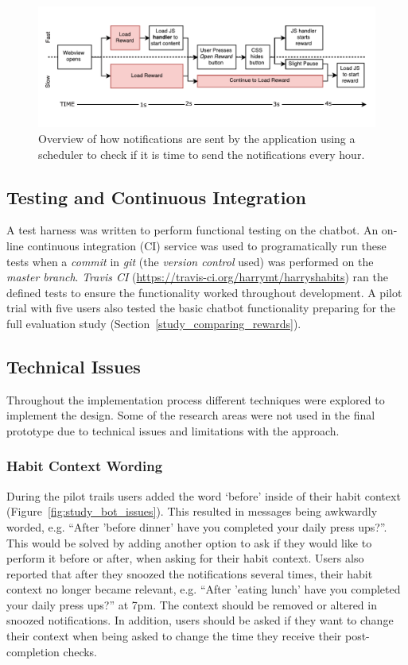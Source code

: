 \begin{figure}[H]
    \centering
    \includegraphics[width=6in]{../resources/diagrams/webview-flow-diagram.pdf}
    \caption{Overview of how notifications are sent by the application using a scheduler to check if it is time to send the notifications every hour.}
    \label{fig:fast_slow_opening_rewards}
\end{figure}


\subsection{Testing and Continuous Integration}
A test harness was written to perform functional testing on the chatbot. An on-line continuous integration (CI) service was used to programatically run these tests when a \textit{commit} in \textit{git} (the \textit{version control} used) was performed on the \textit{master branch}. \textit{Travis CI} (\url{https://travis-ci.org/harrymt/harryshabits}) ran the defined tests to ensure the functionality worked throughout development. A pilot trial with five users also tested the basic chatbot functionality preparing for the full evaluation study (Section~\ref{study_comparing_rewards}).


\subsection{Technical Issues}
Throughout the implementation process different techniques were explored to implement the design.
Some of the research areas were not used in the final prototype due to technical issues and limitations with the approach.

\subsubsection*{Habit Context Wording}
During the pilot trails users added the word `before' inside of their habit context (Figure~\ref{fig:study_bot_issues}). This resulted in messages being awkwardly worded, e.g. ``After 'before dinner' have you completed your daily press ups?''. This would be solved by adding another option to ask if they would like to perform it before or after, when asking for their habit context. Users also reported that after they snoozed the notifications several times, their habit context no longer became relevant, e.g. ``After 'eating lunch' have you completed your daily press ups?'' at 7pm. The context should be removed or altered in snoozed notifications. In addition, users should be asked if they want to change their context when being asked to change the time they receive their post-completion checks.

